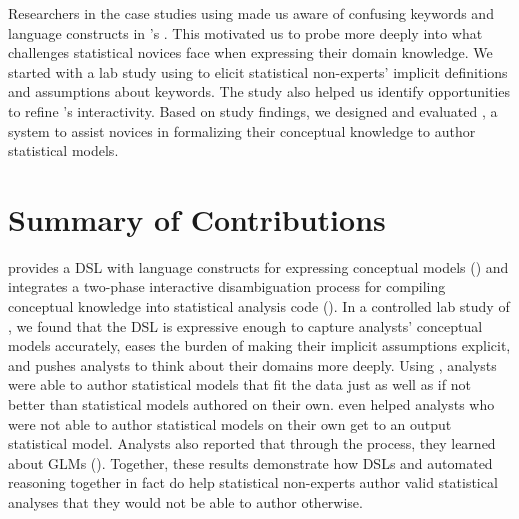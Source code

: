 Researchers in the case studies using \tisane made us aware of confusing
keywords and language constructs in \tisane's \SDSL. This motivated us to probe
more deeply into what challenges statistical novices face when expressing their
domain knowledge. We started with a lab study using \tisane to elicit
statistical non-experts' implicit definitions and assumptions about \SDSL
keywords. The study also helped us identify opportunities to refine \tisane's
interactivity. Based on study findings, we designed and evaluated \rTisane, a
system to assist novices in formalizing their conceptual knowledge to author
statistical models. 









\section{Summary of Contributions}


\rTisane provides a DSL with language constructs for expressing conceptual
models (\thesisChallengeExplicit) and integrates a two-phase interactive
disambiguation process for compiling conceptual knowledge into statistical
analysis code (\thesisChallengeRep). In a controlled lab study of \rTisane, we
found that the DSL is expressive enough to capture analysts' conceptual models
accurately, eases the burden of making their implicit assumptions explicit, and
pushes analysts to think about their domains more deeply. Using \rTisane,
analysts were able to author statistical models that fit the data just as well
as if not better than statistical models authored on their own. \rTisane even
helped analysts who were not able to author statistical models on their own get
to an output statistical model. Analysts also reported that through the process,
they learned about GLMs (\thesisChallengeUnderstanding). Together, these results
demonstrate how DSLs and automated reasoning together in fact do help
statistical non-experts author valid statistical analyses that they would not be
able to author otherwise.

